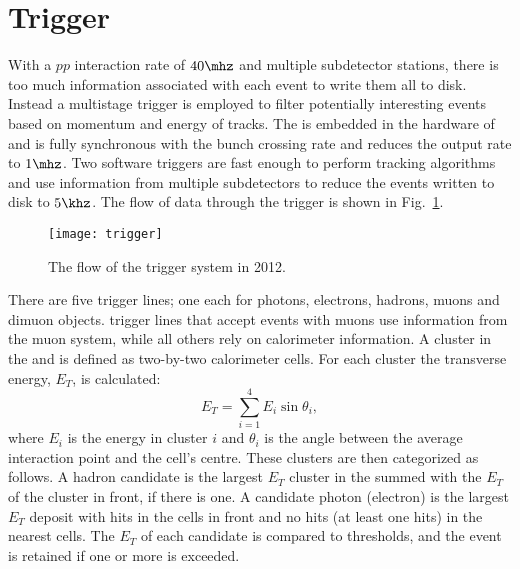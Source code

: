 \section{Trigger}
\label{sec:lhcb:trig}

With a $pp$ interaction rate of $40\mhz$ and multiple subdetector stations, there is too much
information associated with each event to write them all to disk.
Instead a multistage trigger is employed to filter potentially interesting events based on momentum
and energy of tracks.
The \lone is embedded in the hardware of \lhcb and is fully synchronous with
the bunch crossing rate and reduces the output rate to $1\mhz$.
Two software triggers are fast enough to perform tracking algorithms and use information from
multiple subdetectors to reduce the events written to disk to $5\khz$.
The flow of data through the trigger is shown in Fig.~\ref{fig:lhcb:trigger}.

\begin{figure}
  \begin{center}
    \texttt{[image: trigger]}
  \end{center}
  \caption[LHCb trigger sequence in 2012]
  {
    The flow of the \lhcb trigger system in 2012.
  }
  \label{fig:lhcb:trigger}
\end{figure}

There are five \lone trigger lines; one each for photons, electrons, hadrons, muons and dimuon
objects.
\lone trigger lines that accept events with muons use information from the muon system, while all
others rely on calorimeter information.
A cluster in the \ecal and \hcal is defined as two-by-two calorimeter cells.
For each cluster the transverse energy, $E_T$, is calculated:
\begin{equation}
  E_T = \sum_{i=1}^4E_i\sin\theta_i,
\end{equation}
where $E_i$ is the energy in cluster $i$ and $\theta_i$ is the angle between the average
interaction point and the cell's centre.
These clusters are then categorized as follows.
A hadron candidate is the largest $E_T$ cluster in the \hcal summed with the $E_T$ of the \ecal
cluster in front, if there is one.
A candidate photon (electron) is the largest $E_T$ deposit with hits in the \presh cells in front and
no hits (at least one hits) in the nearest \spd cells.
The $E_T$ of each candidate is compared to thresholds, and the event is retained if one or more is
exceeded.

